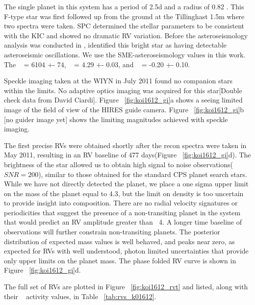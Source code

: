 \documentclass{emulateapj}
\begin{document}
The single planet in this system has a period of 2.5d and a radius of 0.82 \rearthe. This F-type star was first followed up from the ground at the Tillinghast 1.5m where two spectra were taken. SPC determined the stellar parameters to be consistent with the KIC and showed no dramatic RV variation.  Before the asteroseismology analysis was conducted in \cite{Huber2013},  \cite{Bruntt2012} identified this bright star as having detectable asteroseismic oscillations.  We use the SME-asteroseismology values in this work. The \teff~ = 6104 +- 74, \logg~ = 4.29 +- 0.03, and \feh~ = -0.20 +- 0.10.

 Speckle imaging taken at the WIYN in July 2011 found no companion stars  within the limits. No adaptive optics imaging was acquired for this star[Double check data from David Ciardi]. Figure ~\ref{fig:koi1612_gi}a shows a seeing limited image of the field of view of the HIRES guide camera.  Figure ~\ref{fig:koi1612_gi}b [no guider image yet] shows the limiting magnitudes achieved with speckle imaging.

 The first precise RVs were obtained shortly after the recon spectra were taken in May 2011, resulting in an RV baseline of 477 days(Figure ~\ref{fig:koi1612_gi}d). The brightness of the star allowed us to obtain high signal to noise observations($SNR=200$), similar to those obtained for the standard CPS planet search stars. While we have not directly detected the planet, we place a one sigma upper limit on the mass of the planet equal to 4.3\mearthe, but the limit on density is too uncertain to provide insight into composition. There are no radial velocity signatures or periodicities that suggest the presence of a non-transiting planet in the system that would predict an RV amplitude greater than $~$ 4\ms. A longer time baseline of observations will further constrain non-transiting planets. The posterior distribution of expected mass values is well behaved, and peaks near zero, as expected for RVs with well understood, photon limited uncertainties that provide only upper limits on the planet mass. The phase folded RV curve is shown in Figure ~\ref{fig:koi1612_gi}d.

The full set of RVs are plotted in  Figure ~\ref{fig:koi1612_rvt}  and listed, along with their \rphk~ activity values, in Table ~\ref{tab:rvs_k01612}.

\subsection{\koioneninetwofive} %
\end{document}
